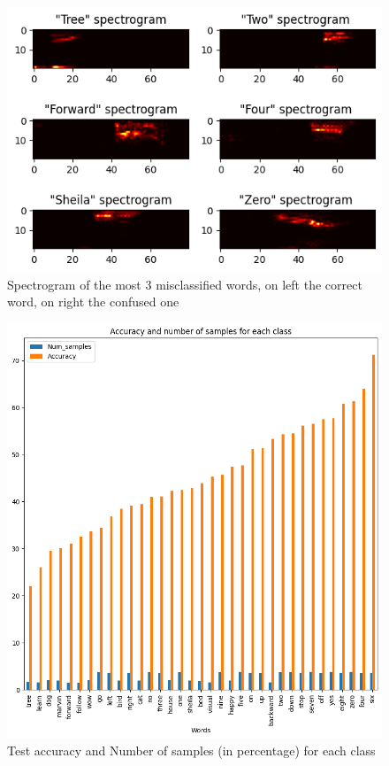 \documentclass{class}
\begin{document}
\begin{figure}[H]
    \centering
    \includegraphics[width=.8\columnwidth]{images/misclassified_words.png}
    \caption{Spectrogram of the most 3 misclassified words, on left the correct word, on right the confused one}
    \label{fig-6}
\end{figure}

\begin{figure}[H]
    \centering
    \includegraphics[width=.7\columnwidth]{images/num_vs_accuracy.png}
    \caption{Test accuracy and Number of samples (in percentage) for each class}
    \label{fig-7}
\end{figure}
\end{document}
